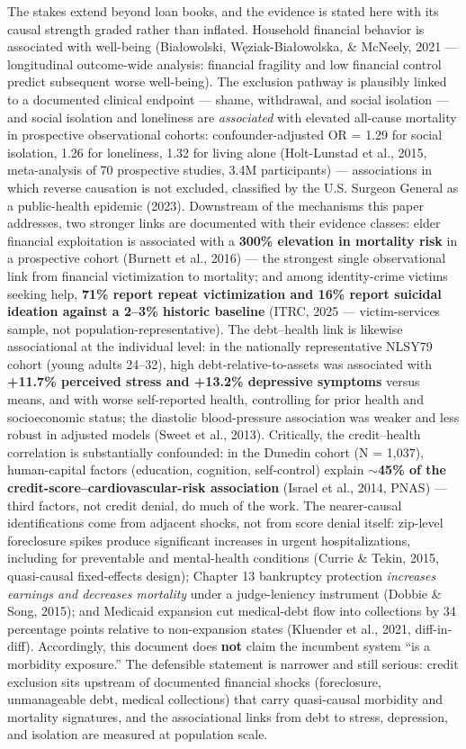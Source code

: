 \documentclass[
]{article}
\begin{document}
The stakes extend beyond loan books, and the evidence is stated here
with its causal strength graded rather than inflated. Household
financial behavior is associated with well-being (Białowolski,
Węziak-Białowolska, \& McNeely, 2021 --- longitudinal outcome-wide
analysis: financial fragility and low financial control predict
subsequent worse well-being). The exclusion pathway is plausibly linked
to a documented clinical endpoint --- shame, withdrawal, and social
isolation --- and social isolation and loneliness are \emph{associated}
with elevated all-cause mortality in prospective observational cohorts:
confounder-adjusted OR = 1.29 for social isolation, 1.26 for loneliness,
1.32 for living alone (Holt-Lunstad et al., 2015, meta-analysis of 70
prospective studies, 3.4M participants) --- associations in which
reverse causation is not excluded, classified by the U.S. Surgeon
General as a public-health epidemic (2023). Downstream of the mechanisms
this paper addresses, two stronger links are documented with their
evidence classes: elder financial exploitation is associated with a
\textbf{300\% elevation in mortality risk} in a prospective cohort
(Burnett et al., 2016) --- the strongest single observational link from
financial victimization to mortality; and among identity-crime victims
seeking help, \textbf{71\% report repeat victimization and 16\% report
suicidal ideation against a 2--3\% historic baseline} (ITRC, 2025 ---
victim-services sample, not population-representative). The debt--health
link is likewise associational at the individual level: in the
nationally representative NLSY79 cohort (young adults 24--32), high
debt-relative-to-assets was associated with \textbf{+11.7\% perceived
stress and +13.2\% depressive symptoms} versus means, and with worse
self-reported health, controlling for prior health and socioeconomic
status; the diastolic blood-pressure association was weaker and less
robust in adjusted models (Sweet et al., 2013). Critically, the
credit--health correlation is substantially confounded: in the Dunedin
cohort (N = 1,037), human-capital factors (education, cognition,
self-control) explain \textbf{\(\sim\)45\% of the
credit-score--cardiovascular-risk association} (Israel et al., 2014,
PNAS) --- third factors, not credit denial, do much of the work. The
nearer-causal identifications come from adjacent shocks, not from score
denial itself: zip-level foreclosure spikes produce significant
increases in urgent hospitalizations, including for preventable and
mental-health conditions (Currie \& Tekin, 2015, quasi-causal
fixed-effects design); Chapter 13 bankruptcy protection \emph{increases
earnings and decreases mortality} under a judge-leniency instrument
(Dobbie \& Song, 2015); and Medicaid expansion cut medical-debt flow
into collections by 34 percentage points relative to non-expansion
states (Kluender et al., 2021, diff-in-diff). Accordingly, this document
does \textbf{not} claim the incumbent system ``is a morbidity
exposure.'' The defensible statement is narrower and still serious:
credit exclusion sits upstream of documented financial shocks
(foreclosure, unmanageable debt, medical collections) that carry
quasi-causal morbidity and mortality signatures, and the associational
links from debt to stress, depression, and isolation are measured at
population scale.
\end{document}
